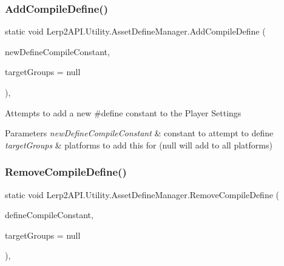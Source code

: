 \subsubsection{\texorpdfstring{Add\+Compile\+Define()}{AddCompileDefine()}}
{\footnotesize\ttfamily static void Lerp2\+A\+P\+I.\+Utility.\+Asset\+Define\+Manager.\+Add\+Compile\+Define (\begin{DoxyParamCaption}\item[{string}]{new\+Define\+Compile\+Constant,  }\item[{Build\+Target\+Group \mbox{[}$\,$\mbox{]}}]{target\+Groups = {\ttfamily null} }\end{DoxyParamCaption})\hspace{0.3cm}{\ttfamily [inline]}, {\ttfamily [static]}}



Attempts to add a new \#define constant to the Player Settings 


\begin{DoxyParams}{Parameters}
{\em new\+Define\+Compile\+Constant} & constant to attempt to define\\
\hline
{\em target\+Groups} & platforms to add this for (null will add to all platforms)\\
\hline
\end{DoxyParams}
\mbox{\label{class_lerp2_a_p_i_1_1_utility_1_1_asset_define_manager_a3a1590728fc4b737b7ef2a69701a6a3e}} 
\subsubsection{\texorpdfstring{Remove\+Compile\+Define()}{RemoveCompileDefine()}}
{\footnotesize\ttfamily static void Lerp2\+A\+P\+I.\+Utility.\+Asset\+Define\+Manager.\+Remove\+Compile\+Define (\begin{DoxyParamCaption}\item[{string}]{define\+Compile\+Constant,  }\item[{Build\+Target\+Group \mbox{[}$\,$\mbox{]}}]{target\+Groups = {\ttfamily null} }\end{DoxyParamCaption})\hspace{0.3cm}{\ttfamily [inline]}, {\ttfamily [static]}}



